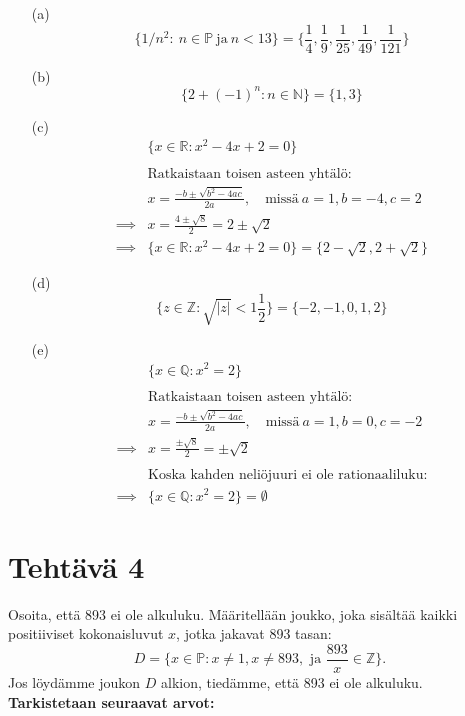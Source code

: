 \documentclass{article}
\begin{document}
\begin{enumerate}
	
	\item[(a)]
	\[
	\{1/n^{2}: \ n \in \mathbb{P} \ \text{ja} \  n < 13 \} = \{ \frac{1}{4}, \frac{1}{9}, \frac{1}{25}, \frac{1}{49}, \frac{1}{121} \}
	\]

	\item[(b)]
	\[
	\{ 2+ (-1)^{n}: n \in \mathbb{N}\} = \{ 1, 3 \}
	\]

	\item[(c)]
	\[
	\begin{aligned}
	&\{x \in \mathbb{R}: x^{2} - 4x  + 2 = 0\} \\
	\\
	&\text{Ratkaistaan toisen asteen yhtälö:} \\
	&x = \frac{-b \pm\sqrt{b^2 - 4ac}}{2a}, \quad \text{missä} \ a = 1, b = -4, c = 2 \\
	\implies &x = \frac{4 \pm \sqrt{8}}{2} = 2 \pm \sqrt{2} \\
	\implies &\{x \in \mathbb{R}: x^{2} - 4x + 2 = 0\} = \{2 - \sqrt{2}, 2 + \sqrt{2}\}
	\end{aligned}
	\]

	\item[(d)]
	\[
	\{z \in \mathbb{Z}: \sqrt{\lvert z \rvert} < 1 \frac{1}{2} \} = \{ -2, -1, 0, 1, 2 \}
	\]

	\item[(e)]
	\[
	\begin{aligned}
	&\{x \in \mathbb{Q}: x^{2} = 2\} \\
	\\
	&\text{Ratkaistaan toisen asteen yhtälö:} \\
	&x = \frac{-b \pm\sqrt{b^2 - 4ac}}{2a}, \quad \text{missä} \ a = 1, b = 0, c = -2 \\
	\implies &x = \frac{\pm \sqrt{8}}{2} = \pm \sqrt{2} \\	
	\\ &\text{Koska kahden neliöjuuri ei ole rationaaliluku:} \\
	\implies &\{x \in \mathbb{Q}: x^{2} = 2\} = \emptyset
	\end{aligned}
	\]

\end{enumerate}


\newpage

\section*{Tehtävä 4}
Osoita, että 893 ei ole alkuluku.
\newline
\newline
Määritellään joukko, joka sisältää kaikki positiiviset kokonaisluvut \(x\), jotka jakavat 893 tasan:
\[
D = \{x \in \mathbb{P} : x \neq 1, x \neq 893, \text{ ja } \frac{893}{x} \in \mathbb{Z} \}.
\]
\newline
Jos löydämme joukon \(D\) alkion, tiedämme, että 893 ei ole alkuluku.
\newline
\textbf{Tarkistetaan seuraavat arvot:}
\end{document}
